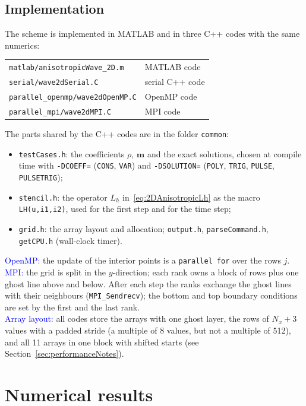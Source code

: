 \documentclass[11pt]{article}
\begin{document}
\subsection{Implementation}
The scheme is implemented in MATLAB and in three C++ codes with the same numerics:
\begin{center}
\begin{tabular}{ll}
\texttt{matlab/anisotropicWave\_2D.m} & MATLAB code \\
\texttt{serial/wave2dSerial.C} & serial C++ code \\
\texttt{parallel\_openmp/wave2dOpenMP.C} & OpenMP code \\
\texttt{parallel\_mpi/wave2dMPI.C} & MPI code
\end{tabular}
\end{center}
The parts shared by the C++ codes are in the folder \texttt{common}:
\begin{itemize}
\item \texttt{testCases.h}: the coefficients $\rho$, $\bm{m}$ and the exact solutions, chosen at compile time with \texttt{-DCOEFF=} (\texttt{CONS}, \texttt{VAR}) and \texttt{-DSOLUTION=} (\texttt{POLY}, \texttt{TRIG}, \texttt{PULSE}, \texttt{PULSETRIG});
\item \texttt{stencil.h}: the operator $L_h$ in~\eqref{eq:2DAnisotropicLh} as the macro \texttt{LH(u,i1,i2)}, used for the first step and for the time step;
\item \texttt{grid.h}: the array layout and allocation; \texttt{output.h}, \texttt{parseCommand.h}, \texttt{getCPU.h} (wall-clock timer).
\end{itemize}
\textcolor{blue}{OpenMP:} the update of the interior points is a \texttt{parallel for} over the rows $j$.\\
\textcolor{blue}{MPI:} the grid is split in the $y$-direction; each rank owns a block of rows plus one ghost line above and below. After each step the ranks exchange the ghost lines with their neighbours (\texttt{MPI\_Sendrecv}); the bottom and top boundary conditions are set by the first and the last rank.\\
\textcolor{blue}{Array layout:} all codes store the arrays with one ghost layer, the rows of $N_x+3$ values with a padded stride (a multiple of 8 values, but not a multiple of 512), and all 11 arrays in one block with shifted starts (see Section~\ref{sec:performanceNotes}).

\section{Numerical results}
\end{document}

